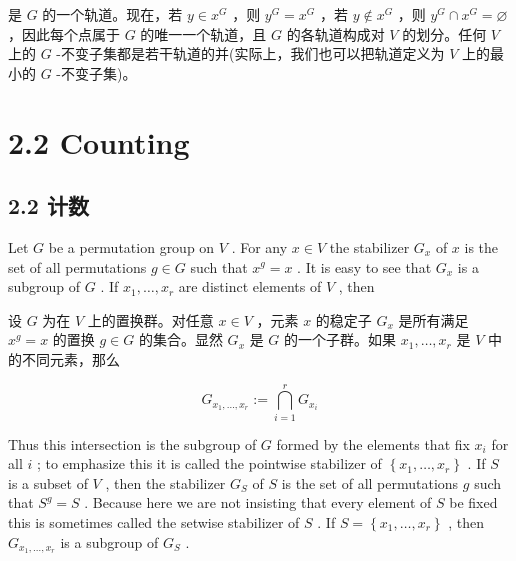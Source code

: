 \documentclass[10pt]{article}
\begin{document}
\begin{tcolorbox}\relax
是 \(G\) 的一个轨道。现在，若 \(y \in  {x}^{G}\) ，则 \({y}^{G} = {x}^{G}\) ，若 \(y \notin  {x}^{G}\) ，则 \({y}^{G} \cap  {x}^{G} = \varnothing\) ，因此每个点属于 \(G\) 的唯一一个轨道，且 \(G\) 的各轨道构成对 \(V\) 的划分。任何 \(V\) 上的 \(G\) -不变子集都是若干轨道的并(实际上，我们也可以把轨道定义为 \(V\) 上的最小的 \(G\) -不变子集)。
\end{tcolorbox}

\section*{2.2 Counting}

\begin{tcolorbox}\relax
\section*{2.2 计数}
\end{tcolorbox}

Let \(G\) be a permutation group on \(V\) . For any \(x \in  V\) the stabilizer \({G}_{x}\) of \(x\) is the set of all permutations \(g \in  G\) such that \({x}^{g} = x\) . It is easy to see that \({G}_{x}\) is a subgroup of \(G\) . If \({x}_{1},\ldots ,{x}_{r}\) are distinct elements of \(V\) , then

\begin{tcolorbox}\relax
设 \(G\) 为在 \(V\) 上的置换群。对任意 \(x \in  V\) ，元素 \(x\) 的稳定子 \({G}_{x}\) 是所有满足 \({x}^{g} = x\) 的置换 \(g \in  G\) 的集合。显然 \({G}_{x}\) 是 \(G\) 的一个子群。如果 \({x}_{1},\ldots ,{x}_{r}\) 是 \(V\) 中的不同元素，那么
\end{tcolorbox}

\[
{G}_{{x}_{1},\ldots ,{x}_{r}} \mathrel{\text{ := }} \mathop{\bigcap }\limits_{{i = 1}}^{r}{G}_{{x}_{i}}
\]

Thus this intersection is the subgroup of \(G\) formed by the elements that fix \({x}_{i}\) for all \(i\) ; to emphasize this it is called the pointwise stabilizer of \(\left\{  {{x}_{1},\ldots ,{x}_{r}}\right\}\) . If \(S\) is a subset of \(V\) , then the stabilizer \({G}_{S}\) of \(S\) is the set of all permutations \(g\) such that \({S}^{g} = S\) . Because here we are not insisting that every element of \(S\) be fixed this is sometimes called the setwise stabilizer of \(S\) . If \(S = \left\{  {{x}_{1},\ldots ,{x}_{r}}\right\}\) , then \({G}_{{x}_{1},\ldots ,{x}_{r}}\) is a subgroup of \({G}_{S}\) .
\end{document}
